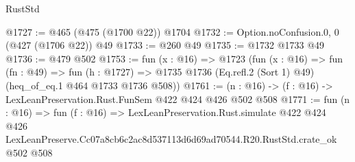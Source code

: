\begin{lexlean}{RustStd}
\begin{coremodule}
@1727 := @465 (@475 (@1700 @22)) @1704
@1732 := Option.noConfusion.{0, 0} (@427 (@1706 @22)) @49
@1733 := @260 @49
@1735 := @1732 @1733 @49
@1736 := @479 @502
@1753 := fun (x : @16) =>
  @1723
    (fun (x : @16) =>
    fun (fn : @49) =>
    fun (h : @1727) => @1735 @1736 (Eq.refl.{2} (Sort 1) @49) (heq_of_eq.{1} @464 @1733 @1736 @508))
@1761 := (n : @16) -> (f : @16) -> LexLeanPreservation.Rust.FunSem @422 @424 @426 @502 @508
@1771 := fun (n : @16) =>
  fun (f : @16) =>
  LexLeanPreservation.Rust.simulate
    @422
    @424
    @426
    LexLeanPreserve.Cc07a8cb6c2ac8d537113d6d69ad70544.R20.RustStd.crate_ok
    @502
    @508
\end{coremodule}
\end{lexlean}
